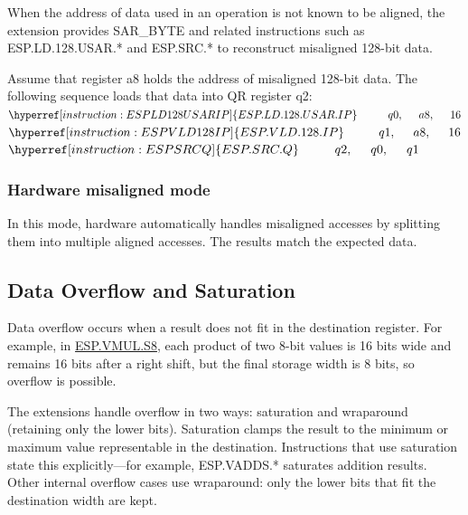 \documentclass[main\_\_EN.tex]{subfiles}
\begin{document}
When the address of data used in an operation is not known to be aligned, the extension provides SAR\_BYTE and related instructions such as ESP.LD.128.USAR.* and ESP.SRC.* to reconstruct misaligned 128-bit data.

Assume that register a8 holds the address of misaligned 128-bit data. The following sequence loads that data into QR register q2:\\
$ \hyperref[instruction:ESPLD128USARIP]{ESP.LD.128.USAR.IP}\hspace{1cm}q0,\hspace{0.5cm}a8,\hspace{0.5cm}16 $ \\
$ \hyperref[instruction:ESPVLD128IP]{ESP.VLD.128.IP}\hspace{1cm}q1,\hspace{0.5cm}a8,\hspace{0.5cm}16 $ \\
$ \hyperref[instruction:ESPSRCQ]{ESP.SRC.Q}\hspace{1cm}q2,\hspace{0.5cm}q0,\hspace{0.5cm}q1 $

\subsubsection{Hardware misaligned mode}

In this mode, hardware automatically handles misaligned accesses by splitting them into multiple aligned accesses. The results match the expected data.

\subsection{Data Overflow and Saturation}

Data overflow occurs when a result does not fit in the destination register. For example, in \hyperref[instruction:ESPVMULS8]{ESP.VMUL.S8}, each product of two 8-bit values is 16 bits wide and remains 16 bits after a right shift, but the final storage width is 8 bits, so overflow is possible.

The \chipname{} extensions handle overflow in two ways: saturation and wraparound (retaining only the lower bits). Saturation clamps the result to the minimum or maximum value representable in the destination. Instructions that use saturation state this explicitly—for example, ESP.VADDS.* saturates addition results. Other internal overflow cases use wraparound: only the lower bits that fit the destination width are kept.
\end{document}
